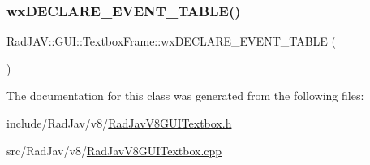 \subsubsection{\texorpdfstring{wx\+D\+E\+C\+L\+A\+R\+E\+\_\+\+E\+V\+E\+N\+T\+\_\+\+T\+A\+B\+L\+E()}{wxDECLARE\_EVENT\_TABLE()}}
{\footnotesize\ttfamily Rad\+J\+A\+V\+::\+G\+U\+I\+::\+Textbox\+Frame\+::wx\+D\+E\+C\+L\+A\+R\+E\+\_\+\+E\+V\+E\+N\+T\+\_\+\+T\+A\+B\+LE (\begin{DoxyParamCaption}{ }\end{DoxyParamCaption})\hspace{0.3cm}{\ttfamily [protected]}}



The documentation for this class was generated from the following files\+:\begin{DoxyCompactItemize}
\item 
include/\+Rad\+Jav/v8/\mbox{\hyperlink{_rad_jav_v8_g_u_i_textbox_8h}{Rad\+Jav\+V8\+G\+U\+I\+Textbox.\+h}}\item 
src/\+Rad\+Jav/v8/\mbox{\hyperlink{_rad_jav_v8_g_u_i_textbox_8cpp}{Rad\+Jav\+V8\+G\+U\+I\+Textbox.\+cpp}}\end{DoxyCompactItemize}
